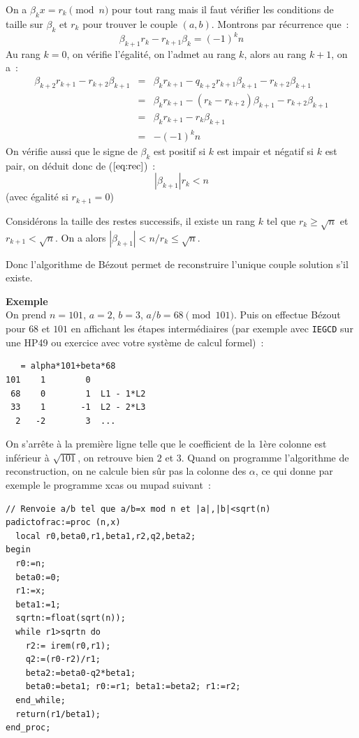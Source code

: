 \documentclass[a4paper,11pt]{article}
\begin{document}
\begin{giacjshere}
On a $ \beta_k x= r_k \pmod n$ pour tout rang mais il faut v\'erifier
les conditions de taille sur $\beta_k$ et $r_k$ pour trouver le couple
$(a,b)$.
Montrons par r\'ecurrence que~:
\begin{equation} \label{eq:rec}
 \beta_{k+1} r_k - r_{k+1} \beta_k = (-1)^k n 
\end{equation}
Au rang $k=0$, on v\'erifie l'\'egalit\'e, on l'admet au rang $k$, 
alors au rang $k+1$, on a~:
\begin{eqnarray*}
 \beta_{k+2} r_{k+1} - r_{k+2} \beta_{k+1} 
& = & \beta_k r_{k+1} - q_{k+2} r_{k+1} \beta_{k+1}  - r_{k+2} \beta_{k+1} \\
& = & \beta_k r_{k+1} - (r_{k}-r_{k+2}) \beta_{k+1}  - r_{k+2} \beta_{k+1} \\
& = & \beta_k r_{k+1} - r_{k} \beta_{k+1} \\
& = & - (-1)^k n
\end{eqnarray*}
On v\'erifie aussi que le signe de $\beta_k$ est positif si $k$ est impair
et n\'egatif si $k$ est pair, on d\'eduit donc de (\(\ref{eq:rec}\))~:
\[ |\beta_{k+1}| r_k < n \]
(avec \'egalit\'e si $r_{k+1}=0$)

Consid\'erons la taille des restes successifs, il existe un rang $k$
tel que $r_k \geq \sqrt{n}$ et $r_{k+1}<\sqrt{n}$. On a alors
$|\beta_{k+1}|  < n/r_k \leq \sqrt{n}$.

Donc l'algorithme de Bézout permet de reconstruire l'unique couple
solution s'il existe.

{\bf Exemple}\\
On prend $n=101$, $a=2$, $b=3$, $a/b=68 \pmod {101}$.
Puis on effectue Bézout pour $68$ et $101$ en affichant les étapes 
intermédiaires (par exemple avec \verb|IEGCD| sur une HP49 ou exercice
avec votre système de calcul formel)~:
\begin{verbatim}
   = alpha*101+beta*68
101    1        0
 68    0        1  L1 - 1*L2
 33    1       -1  L2 - 2*L3
  2   -2        3  ...
\end{verbatim}
On s'arrête à la première ligne telle que le coefficient de la 1ère colonne
est inférieur à $\sqrt{101}$, on retrouve bien $2$ et $3$.
Quand on programme l'algorithme de
reconstruction, on ne calcule bien sûr pas la colonne des $\alpha$,
ce qui donne par exemple le programme xcas ou mupad suivant~:
\begin{verbatim}
// Renvoie a/b tel que a/b=x mod n et |a|,|b|<sqrt(n)
padictofrac:=proc (n,x)
  local r0,beta0,r1,beta1,r2,q2,beta2;
begin
  r0:=n;
  beta0:=0;
  r1:=x;
  beta1:=1;
  sqrtn:=float(sqrt(n));
  while r1>sqrtn do
    r2:= irem(r0,r1); 
    q2:=(r0-r2)/r1;
    beta2:=beta0-q2*beta1;
    beta0:=beta1; r0:=r1; beta1:=beta2; r1:=r2;
  end_while;
  return(r1/beta1);
end_proc;
\end{verbatim}



\end{giacjshere}
\end{document}
